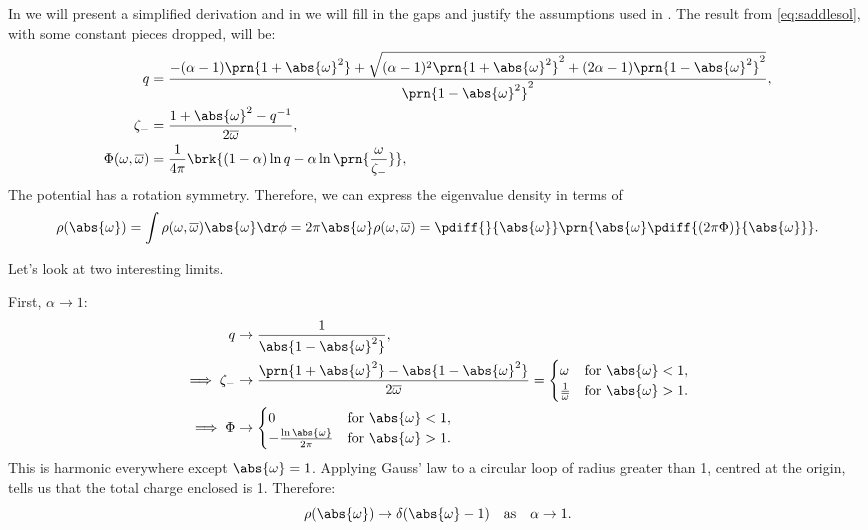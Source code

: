 \documentclass[12pt]{article}
\newcommand{\inv}{^{-1}}
\newcommand{\omb}{\overline{\omega}}
\newcommand{\oa}{\abs{\omega}}
\newcommand{\opo}{\prn{1+\abs{\omega}^2}}
\newcommand{\omo}{\prn{1-\abs{\omega}^2}}
\newcommand{\omoa}{\abs{1-\abs{\omega}^2}}
\begin{document}
In  we will present a simplified derivation and in  we will fill in the gaps and justify the assumptions used in .
The result from \eqref{eq:saddlesol}, with some constant pieces dropped, will be:
%
\begin{equation}\label{eq:phisol}
\begin{aligned}
  q &= \frac{ -(\alpha-1)\opo + \sqrt{ (\alpha-1)^2\opo^2 + (2\alpha-1)\omo^2 } }{\omo^2},\\
  \zeta_- &= \frac{1+\abs{\omega}^2-q\inv}{2\omb},\\
  \Phi(\omega,\omb) &= \frac{1}{4\pi}\brk{ (1-\alpha)\ln q -\alpha\ln\prn{\frac{\omega}{\zeta_-}} },
\end{aligned}
\end{equation}
%
The potential has a rotation symmetry.
Therefore, we can express the eigenvalue density in terms of
%
\begin{equation}\label{eq:radialrho}
  \rho(\oa) = \int \rho(\omega,\omb)\oa\dr\phi = 2\pi\oa\rho(\omega,\omb)
   = \pdiff{}{\oa}\prn{\oa\pdiff{(2\pi\Phi)}{\oa}}.
\end{equation}
%


Let's look at two interesting limits.

First, $\alpha\to1$:
%
\begin{equation}\label{eq:rszmphiato1}
\begin{aligned}
  q &\to \frac{1}{\omoa},\\
  \implies\zeta_- &\to \frac{\opo-\omoa}{2\omb} =
     \begin{cases}
       \omega &\text{for } \abs{\omega}<1,\\
       \frac{1}{\omb} &\text{for } \abs{\omega}>1.\\
     \end{cases}\\
  \implies\Phi &\to
     \begin{cases}
       0 &\text{for } \abs{\omega}<1,\\
       -\frac{\ln\abs{\omega}}{2\pi} &\text{for } \abs{\omega}>1.\\
     \end{cases}
\end{aligned}
\end{equation}
%
This is harmonic everywhere except $\abs{\omega}=1$.
Applying Gauss' law to a circular loop of radius greater than 1, centred at the origin, tells us that the total charge enclosed is 1.
Therefore:
%
\begin{equation}\label{eq:rhoato1}
  \rho(\oa) \to \delta(\abs{\omega}-1)
  \quad\text{as}\quad \alpha\to1.
\end{equation}
%
\end{document}
